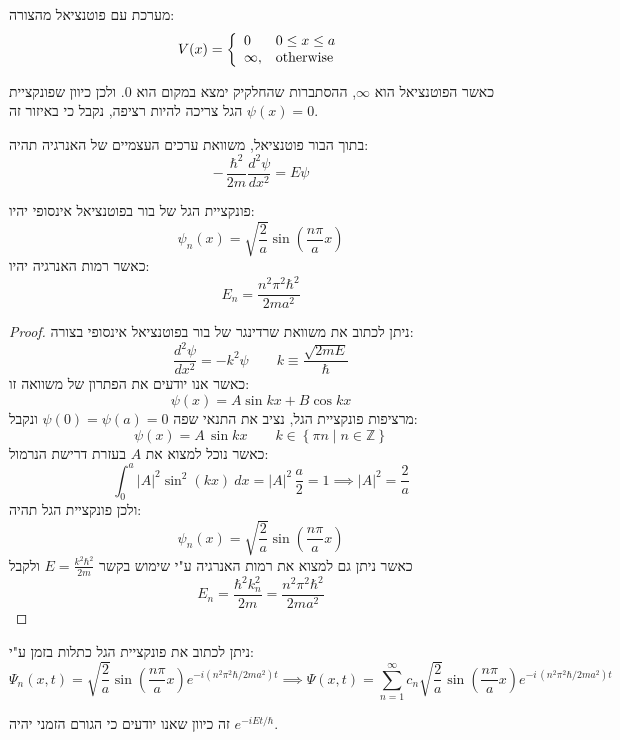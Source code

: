 \documentclass{tstextbook}
\begin{document}
\begin{definition}
מערכת עם פוטנציאל מהצורה:
$$V(x)=\left\{{\begin{array}{l l}{{0}}&{{{0\leq x\leq a}}}\\ {{\infty,}}&{{\mathrm{otherwise}}}\end{array}}\right.$$

\end{definition}
\begin{proposition}
כאשר הפוטנציאל הוא \(\infty\), ההסתברות שהחלקיק ימצא במקום הוא 0. ולכן כיוון שפונקציית הגל צריכה להיות רציפה, נקבל כי באיזור זה \(\psi(x)=0\).

\end{proposition}
\begin{proposition}
בתוך הבור פוטנציאל, משוואת ערכים העצמיים של האנרגיה תהיה:
$$-\,\frac{\hbar^{2}}{2m}\frac{d^{2}\psi}{d x^{2}}=E\psi$$

\end{proposition}
\begin{proposition}
פונקציית הגל של בור בפוטנציאל אינסופי יהיו:
$$\psi_{n}(x)=\sqrt{\frac{2}{a}}\sin\left(\frac{n\pi}{a}x\right)$$
כאשר רמות האנרגיה יהיו:
$$E_{n}={\frac{n^{2}\pi^{2}\hbar^{2}}{2m a^{2}}}$$

\end{proposition}
\begin{proof}
ניתן לכתוב את משוואת שרדינגר של בור בפוטנציאל אינסופי בצורה:
$${\frac{d^{2}\psi}{d x^{2}}}=-k^{2}\psi \qquad k\equiv{\frac{\sqrt{2m E}}{\hbar}}$$
כאשר אנו יודעים את הפתרון של משוואה זו:
$$\psi(x)=A\sin k x+B\cos k x$$
מרציפות פונקציית הגל, נציב את התנאי שפה \(\psi(0)=\psi(a)=0\) ונקבל:
$$\psi(x)=A\,\sin k x \qquad k \in \left\{  \pi n\mid n \in \mathbb{Z}  \right\}$$
כאשר נוכל למצוא את \(A\) בעזרת דרישת הנרמול:
$$\int_{0}^{a}|A|^{2}\sin^{2}(k x)\ d x=|A|^{2}\,{\frac{a}{2}}=1\implies|A|^{2}={\frac{2}{a}}$$
ולכן פונקציית הגל תהיה:
$$\psi_{n}(x)=\sqrt{\frac{2}{a}}\sin\left(\frac{n\pi}{a}x\right)$$
כאשר ניתן גם למצוא את רמות האנרגיה ע"י שימוש בקשר \(E=\frac{k^{2}\hbar^{2}}{2m}\) ולקבל
$$E_{n}={\frac{\hbar^{2}k_{n}^{2}}{2m}}={\frac{n^{2}\pi^{2}\hbar^{2}}{2m a^{2}}}$$

\end{proof}
\begin{corollary}
ניתן לכתוב את פונקציית הגל כתלות בזמן ע"י:
$$\Psi_{n}(x,t)=\sqrt{\frac{2}{a}}\sin\left({\frac{n\pi}{a}}x\right)e^{-i\left( n^{2}\pi^{2}\hbar/2m a^{2} \right)t}\implies \Psi(x,t)=\sum_{n=1}^{\infty}c_{n}{\sqrt{\frac{2}{a}}}\sin\left({\frac{n\pi}{a}}x\right)e^{-i\,(n^{2}\pi^{2}\hbar/2m a^{2})t}$$

\end{corollary}
זה כיוון שאנו יודעים כי הגורם הזמני יהיה \(e^{ -iEt/\hbar }\).
\end{document}
